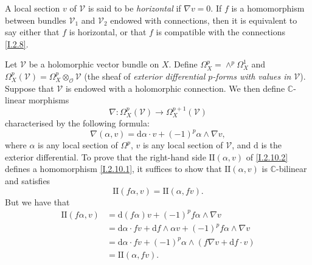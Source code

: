\documentclass{report}
\theoremstyle{plain}
\theoremstyle{definition}
\newenvironment{env}[1]
    {\renewcommand\theinnercustomenv{#1}\innercustomenv}
    {\endinnercustomenv}
\newcommand{\sh}{\mathscr}
\newcommand{\CC}{\mathbb{C}}
\newcommand{\dd}{\mathrm{d}}
\newcommand{\II}{\mathrm{II}}
\begin{document}
\begin{env}{2.9}
\label{I.2.9}
  A local section $v$ of $\sh{V}$ is said to be \emph{horizontal} if $\nabla v=0$.
  If $f$ is a homomorphism between bundles $\sh{V}_1$ and $\sh{V}_2$ endowed with connections, then it is equivalent to say either that $f$ is horizontal, or that $f$ is compatible with the connections \cref{I.2.8}.
\end{env}

\begin{env}{2.10}
\label{I.2.10}
  Let $\sh{V}$ be a holomorphic vector bundle on $X$.
  Define $\Omega_X^p=\wedge^p\Omega_X^1$ and $\Omega_X^p(\sh{V})=\Omega_X^p\otimes_\sh{O}\sh{V}$ (the sheaf of \emph{exterior differential $p$-forms with values in $\sh{V}$}).
  Suppose that $\sh{V}$ is endowed with a holomorphic connection.
  We then define $\CC$-linear morphisms
  \[
  \label{I.2.10.1}
    \nabla\colon \Omega_X^p(\sh{V}) \to \Omega_X^{p+1}(\sh{V})
  \tag{2.10.1}
  \]
  characterised by the following formula:
  \[
  \label{I.2.10.2}
    \nabla(\alpha,v) = \dd\alpha\cdot v + (-1)^p\alpha\wedge\nabla v,
  \tag{2.10.2}
  \]
  where $\alpha$ is any local section of $\Omega^p$, $v$ is any local section of $\sh{V}$, and $\dd$ is the exterior differential.
  To prove that the right-hand side $\II(\alpha,v)$ of \cref{I.2.10.2} defines a homomorphism \cref{I.2.10.1}, it suffices to show that $\II(\alpha,v)$ is $\CC$-bilinear and satisfies
  \[
    \II(f\alpha,v) = \II(\alpha,fv).
  \]
  But we have that
  \[
    \begin{aligned}
      \II(f\alpha,v)
      &= \dd(f\alpha)v + (-1)^pf\alpha\wedge\nabla v
    \\&= \dd\alpha\cdot fv + \dd f\wedge\alpha v + (-1)^pf\alpha\wedge\nabla v
    \\&= \dd\alpha\cdot fv + (-1)^p\alpha\wedge(f\nabla v+\dd f\cdot v)
    \\&= \II(\alpha,fv).
    \end{aligned}
  \]


\end{env}
\end{document}
